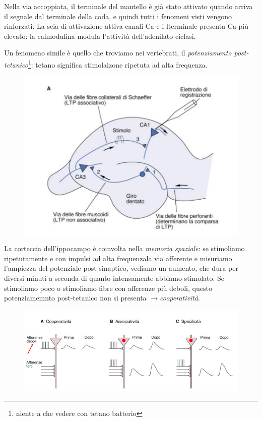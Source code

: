 \documentclass[a4paper,12pt]{article}
\newcommand{\lfreccia}{\ensuremath{\longrightarrow}}
\begin{document}
Nella via accoppiata, il terminale del mantello è già stato attivato quando arriva il segnale dal terminale della coda, e quindi tutti i fenomeni visti vengono rinforzati. La scia di attivazione attiva canali Ca e i lterminale presenta Ca più elevato: la calmodulina modula l'attività dell'adenilato ciclasi.

Un fenomeno simile è quello che troviamo nei vertebrati, il \emph{potenziamento post-tetanico}\footnote{niente a che vedere con tetano batterio}: tetano significa stimolaizone ripetuta ad alta frequenza. 



\begin{figure}[H]
\centering
\includegraphics[scale=0.4]{immagine/piramidale.jpg}
\caption{}
\end{figure}
La corteccia dell'ippocampo è coinvolta nella \emph{memoria spaziale}: se stimoliamo ripetutamente e con impulsi ad alta frequenzala via afferente e misuriamo l'ampiezza del potenziale post-sinaptico, vediamo un aumento, che dura per diversi minuti a seconda di quanto intensamente abbiamo stimolato. Se stimoliamo poco o stimoliamo fibre con afferenze più deboli, questo potenziamemnto post-tetanico non si presenta \lfreccia \emph{cooperatività}.


\begin{figure}[H]
\centering
\includegraphics[scale=0.4]{immagine/associativita.jpg}
\caption{}
\end{figure}
\end{document}
